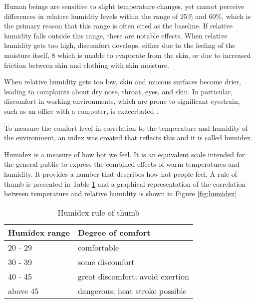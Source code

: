 \qquad Human beings are sensitive to slight temperature changes, yet cannot perceive differences in relative humidity
levels within the range of 25\% and 60\%, which is the primary reason that this range is often cited as the
baseline. If relative humidity falls outside this range, there are notable effects. When relative humidity
gets too high, discomfort develops, either due to the feeling of the moisture itself, 8 which is unable to
evaporate from the skin, or due to increased friction between skin and clothing with skin moisture.

\qquadd When relative humidity gets too low, skin and mucous surfaces become drier, leading to complaints about dry
nose, throat, eyes, and skin. In particular, discomfort in working environments, which are prone to
significant eyestrain, such as an office with a computer, is exacerbated \cite{human_comfort}.

\qquad To measure the comfort level in correlation to the temperature and humidity of the environment, an
index was created that reflects this and it is called humidex.

\qquad Humidex is a measure of how hot we feel. It is an equivalent scale intended for the general public to
express the combined effects of warm temperatures and humidity. It provides a number that describes how hot
people feel. A rule of thumb is presented in Table \ref{table:humidex_thumb} and a graphical representation
of the correlation between temperature and relative humidity is shown in Figure \ref{fig:humidex}
\cite{website:humidex}.

\begin{center}
    \begin{table}[h!]
    \centering
    \begin{tabular}{| l | l |}
        \hline
        Humidex range & Degree of comfort  \\ \hline
        20 - 29 & comfortable \\ \hline
        30 - 39 & some discomfort \\ \hline
        40 - 45 & great discomfort; avoid exertion \\ \hline
        above 45 & dangerous; heat stroke possible \\ \hline
    \end{tabular}
    \caption[Humidex rule of thumb]{Humidex rule of thumb}
    \label{table:humidex_thumb}
    \end{table}
\end{center}


